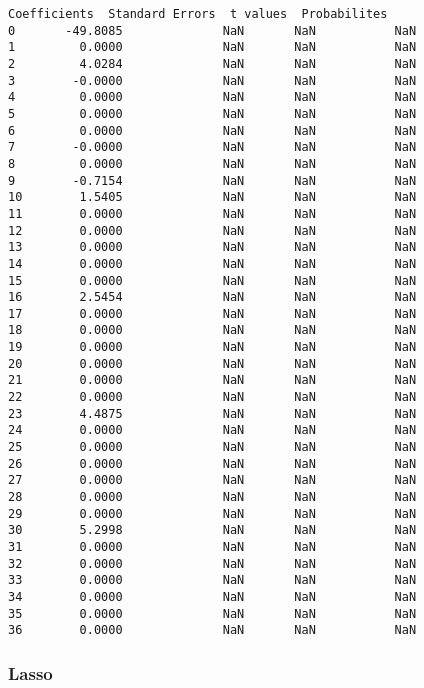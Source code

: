 \documentclass[11pt]{article}
\begin{document}
    \begin{Verbatim}[commandchars=\\\{\}]
    Coefficients  Standard Errors  t values  Probabilites
0       -49.8085              NaN       NaN           NaN
1         0.0000              NaN       NaN           NaN
2         4.0284              NaN       NaN           NaN
3        -0.0000              NaN       NaN           NaN
4         0.0000              NaN       NaN           NaN
5         0.0000              NaN       NaN           NaN
6         0.0000              NaN       NaN           NaN
7        -0.0000              NaN       NaN           NaN
8         0.0000              NaN       NaN           NaN
9        -0.7154              NaN       NaN           NaN
10        1.5405              NaN       NaN           NaN
11        0.0000              NaN       NaN           NaN
12        0.0000              NaN       NaN           NaN
13        0.0000              NaN       NaN           NaN
14        0.0000              NaN       NaN           NaN
15        0.0000              NaN       NaN           NaN
16        2.5454              NaN       NaN           NaN
17        0.0000              NaN       NaN           NaN
18        0.0000              NaN       NaN           NaN
19        0.0000              NaN       NaN           NaN
20        0.0000              NaN       NaN           NaN
21        0.0000              NaN       NaN           NaN
22        0.0000              NaN       NaN           NaN
23        4.4875              NaN       NaN           NaN
24        0.0000              NaN       NaN           NaN
25        0.0000              NaN       NaN           NaN
26        0.0000              NaN       NaN           NaN
27        0.0000              NaN       NaN           NaN
28        0.0000              NaN       NaN           NaN
29        0.0000              NaN       NaN           NaN
30        5.2998              NaN       NaN           NaN
31        0.0000              NaN       NaN           NaN
32        0.0000              NaN       NaN           NaN
33        0.0000              NaN       NaN           NaN
34        0.0000              NaN       NaN           NaN
35        0.0000              NaN       NaN           NaN
36        0.0000              NaN       NaN           NaN
    \end{Verbatim}

    \subsubsection{Lasso}\label{lasso}
\end{document}
